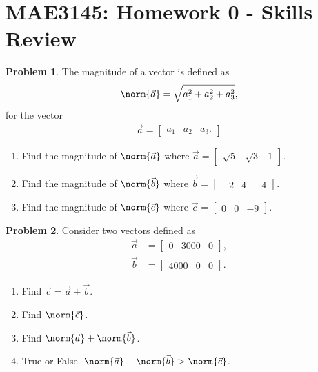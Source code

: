 \documentclass[10pt]{article}
\date{}
\theoremstyle{definition}
\newtheorem{prob}{Problem}[section]
\newenvironment{subprob}%
{\renewcommand{\theenumi}{\alph{enumi}}\renewcommand{\labelenumi}{(\theenumi)}\begin{enumerate}}%
{\end{enumerate}}%
\begin{document}
\pagestyle{empty}
\section*{MAE3145: Homework 0 - Skills Review}
\vspace*{-0.4cm}

\begin{prob}
    The magnitude of a vector is defined as 
    \begin{align*}
        \norm{\vec a} = \sqrt{a_1^2 + a_2^2 + a_3^2} ,
    \end{align*}
    for the vector 
    \begin{align*}
        \vec a = \begin{bmatrix} a_1 & a_2 & a_3 . \end{bmatrix}
    \end{align*}

    \begin{subprob}
        \item Find the magnitude of \( \norm{\vec a} \) where \( \vec{a} = \begin{bmatrix} \sqrt{5} & \sqrt{3} & 1 \end{bmatrix} \).
        \item Find the magnitude of \( \norm{\vec b} \) where \( \vec{b} = \begin{bmatrix} -2 & 4 & -4 \end{bmatrix} \). 
        \item Find the magnitude of \( \norm{\vec c} \) where \( \vec{c} = \begin{bmatrix} 0 & 0 & -9\end{bmatrix} \). 
    \end{subprob}
\end{prob}

\begin{prob}
    Consider two vectors defined as
    \begin{align*}
    \vec a &= \begin{bmatrix} 0 & 3000 & 0 \end{bmatrix} , \\
        \vec b &= \begin{bmatrix} 4000 & 0 & 0 \end{bmatrix}.
    \end{align*}

    \begin{subprob}
    \item Find \( \vec c = \vec a + \vec b \).
    \item Find \( \norm{\vec c} \).
    \item Find \( \norm{\vec a} + \norm{\vec b} \).
    \item True or False. \( \norm{\vec a} + \norm{\vec b} > \norm{\vec c} \).
    \end{subprob}
\end{prob}
\end{document}
